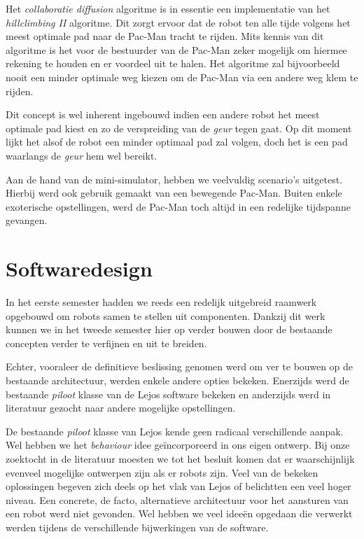 \documentclass[12pt,a4paper]{report}
\begin{document}
Het \emph{collaboratie diffusion} algoritme is in essentie een implementatie van het \emph{hillclimbing II} algoritme. Dit zorgt ervoor dat de robot ten alle tijde volgens het meest optimale pad naar de Pac-Man tracht te rijden. Mits kennis van dit algoritme is het voor de bestuurder van de Pac-Man zeker mogelijk om hiermee rekening te houden en er voordeel uit te halen. Het algoritme zal bijvoorbeeld nooit een minder optimale weg kiezen om de Pac-Man via een andere weg klem te rijden.

Dit concept is wel inherent ingebouwd indien een andere robot het meest optimale pad kiest en zo de verspreiding van de \emph{geur} tegen gaat. Op dit moment lijkt het alsof de robot een minder optimaal pad zal volgen, doch het is een pad waarlangs de \emph{geur} hem wel bereikt.

Aan de hand van de mini-simulator, hebben we veelvuldig scenario's uitgetest. Hierbij werd ook gebruik gemaakt van een bewegende Pac-Man. Buiten enkele exoterische opstellingen, werd de Pac-Man toch altijd in een redelijke tijdspanne gevangen.

\chapter{Softwaredesign}

In het eerste semester hadden we reeds een redelijk uitgebreid raamwerk opgebouwd om robots samen te stellen uit componenten. Dankzij dit werk kunnen we in het tweede semester hier op verder bouwen door de bestaande concepten verder te verfijnen en uit te breiden.

Echter, vooraleer de definitieve beslissing genomen werd om ver te bouwen op de bestaande architectuur, werden enkele andere opties bekeken. Enerzijds werd de bestaande \emph{piloot} klasse van de Lejos software bekeken en anderzijds werd in literatuur gezocht naar andere mogelijke opstellingen.

De bestaande \emph{piloot} klasse van Lejos kende geen radicaal verschillende aanpak. Wel hebben we het \emph{behaviour} idee ge\"incorporeerd in ons eigen ontwerp. Bij onze zoektocht in de literatuur moesten we tot het besluit komen dat er waarschijnlijk evenveel mogelijke ontwerpen zijn als er robots zijn. Veel van de bekeken oplossingen begeven zich deels op het vlak van Lejos of belichtten een veel hoger niveau. Een concrete, de facto, alternatieve architectuur voor het aansturen van een robot werd niet gevonden. Wel hebben we veel idee\"en opgedaan die verwerkt werden tijdens de verschillende bijwerkingen van de software.
\end{document}
